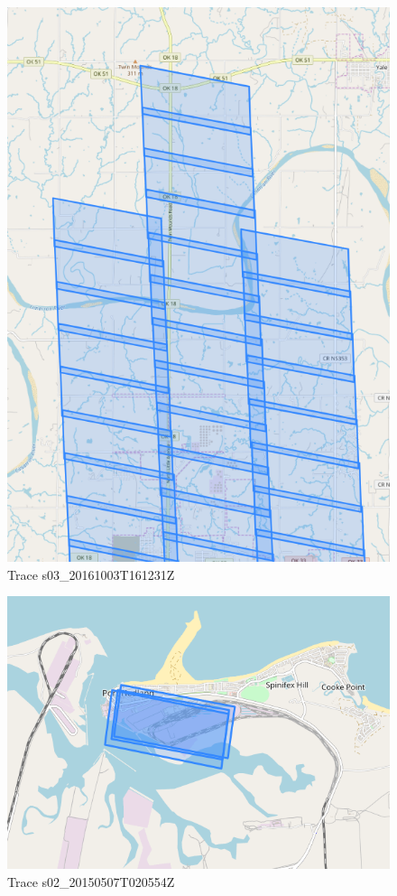 \documentclass[paper=a4, fontsize=11pt, onecolumn, tikz, dvipsnames, svgnames, x11names]{article}
\begin{document}
\newpage
\begin{figure}
    \centering
    \includegraphics[height = 0.8\textheight]{trace_1Z.png}
    \caption{Trace s03\_20161003T161231Z}
    \label{fig_trace_1Z}
\end{figure}

\newpage
\begin{figure}
    \centering
    \includegraphics[height = 0.8\textheight]{trace_video.png}
    \caption{Trace s02\_20150507T020554Z}
    \label{fig_trace_video}
\end{figure}
\end{document}
